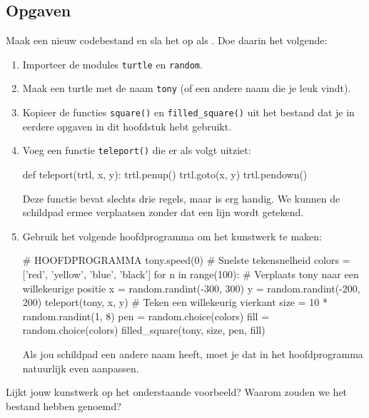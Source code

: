 \documentclass[../main]{subfiles}
\begin{document}
\subsection*{Opgaven}
\begin{opgave}[icons={laptop}]
Maak een nieuw codebestand en sla het op als . Doe daarin het volgende:
\begin{enumerate}[left=0pt .. 2em, itemsep=0.5\baselineskip]
\item Importeer de modules \texttt{turtle} en \texttt{random}.
\item Maak een turtle met de naam \texttt{tony} (of een andere naam die je leuk vindt).
\item Kopieer de functies \texttt{square()} en \texttt{filled\_square()} uit het bestand  dat je in eerdere opgaven in dit hoofdstuk hebt gebruikt.
\item Voeg een functie \texttt{teleport()} die er als volgt uitziet:
\begin{python}[style=mu, aboveskip=.5\baselineskip, numbers=none]
def teleport(trtl, x, y):
    trtl.penup()
    trtl.goto(x, y)
    trtl.pendown()
\end{python}
Deze functie bevat slechts drie regels, maar is erg handig. We kunnen de schildpad ermee verplaatsen zonder dat een lijn wordt getekend.
\item Gebruik het volgende hoofdprogramma om het kunstwerk te maken:
\begin{python}[style=mu, aboveskip=.5\baselineskip, numbers=none]
# HOOFDPROGRAMMA
tony.speed(0)  # Snelste tekensnelheid
colors = ['red', 'yellow', 'blue', 'black']
for n in range(100):
    # Verplaats tony naar een willekeurige positie
    x = random.randint(-300, 300)
    y = random.randint(-200, 200)
    teleport(tony, x, y)
    # Teken een willekeurig vierkant
    size = 10 * random.randint(1, 8)
    pen = random.choice(colors)
    fill = random.choice(colors)
    filled_square(tony, size, pen, fill)
\end{python}
Als jou schildpad een andere naam heeft, moet je dat in het hoofdprogramma natuurlijk even aanpassen.
\end{enumerate}
Lijkt jouw kunstwerk op het onderstaande voorbeeld? Waarom zouden we het bestand  hebben genoemd?
\begin{center}
\end{center}
\end{opgave}
\end{document}
